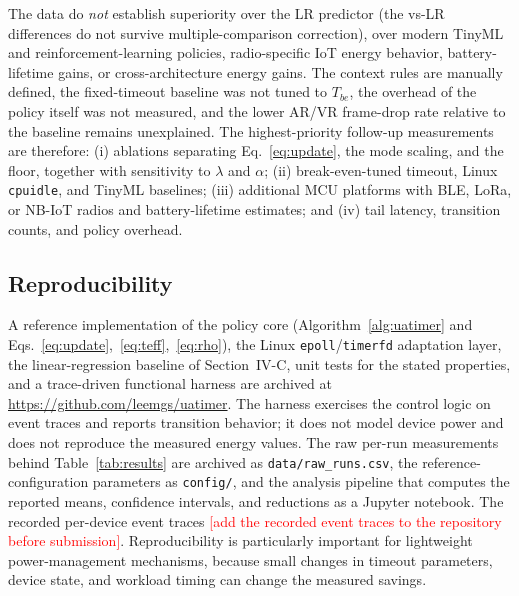 \documentclass[journal]{IEEEtran}
\newcommand{\authorcheck}[1]{\textcolor{red}{[#1]}}
\begin{document}
The data do \emph{not} establish superiority over the LR predictor (the vs-LR differences do not survive multiple-comparison correction), over modern TinyML and reinforcement-learning policies, radio-specific IoT energy behavior, battery-lifetime gains, or cross-architecture energy gains. The context rules are manually defined, the fixed-timeout baseline was not tuned to $T_{be}$, the overhead of the policy itself was not measured, and the lower AR/VR frame-drop rate relative to the baseline remains unexplained. The highest-priority follow-up measurements are therefore:
(i) ablations separating Eq.~\eqref{eq:update}, the mode scaling, and the floor, together with sensitivity to $\lambda$ and $\alpha$;
(ii) break-even-tuned timeout, Linux \texttt{cpuidle}, and TinyML baselines;
(iii) additional MCU platforms with BLE, LoRa, or NB-IoT radios and battery-lifetime estimates; and
(iv) tail latency, transition counts, and policy overhead.

\subsection{Reproducibility}
A reference implementation of the policy core (Algorithm~\ref{alg:uatimer} and Eqs.~\eqref{eq:update},~\eqref{eq:teff},~\eqref{eq:rho}), the Linux \texttt{epoll}/\texttt{timerfd} adaptation layer, the linear-regression baseline of Section~IV-C, unit tests for the stated properties, and a trace-driven functional harness are archived at \url{https://github.com/leemgs/uatimer}. The harness exercises the control logic on event traces and reports transition behavior; it does not model device power and does not reproduce the measured energy values. The raw per-run measurements behind Table~\ref{tab:results} are archived as \texttt{data/raw\_runs.csv}, the reference-configuration parameters as \texttt{config/}, and the analysis pipeline that computes the reported means, confidence intervals, and reductions as a Jupyter notebook. The recorded per-device event traces \authorcheck{add the recorded event traces to the repository before submission}. Reproducibility is particularly important for lightweight power-management mechanisms, because small changes in timeout parameters, device state, and workload timing can change the measured savings.
\end{document}
